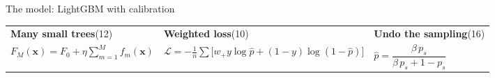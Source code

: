 \documentclass[aspectratio=169,11pt,t]{beamer}
\begin{document}
\begin{frame}{The model: LightGBM with calibration}
\vspace{-3mm}
\begin{center}
\resizebox{0.74\linewidth}{!}{}
\end{center}
\vspace{-3mm}
\begin{softbox}\scriptsize
\begin{tabularx}{\linewidth}{@{}>{\hsize=0.85\hsize}X >{\hsize=1.35\hsize}X >{\hsize=0.8\hsize}X@{}}
\textbf{Many small trees}\hfill{\color{black!55}(12)} &
\textbf{Weighted loss}\hfill{\color{black!55}(10)} &
\textbf{Undo the sampling}\hfill{\color{black!55}(16)} \\[4pt]
\centering $F_M(\mathbf{x})=F_0+\eta\sum_{m=1}^{M} f_m(\mathbf{x})$ &
\centering $\mathcal{L}=-\frac{1}{n}\sum\big[w_{+}y\log\hat p+(1-y)\log(1-\hat p)\big]$ &
\centering\arraybackslash $\hat p=\dfrac{\beta\,p_s}{\beta\,p_s+1-p_s}$
\end{tabularx}
\end{softbox}
\end{frame}
\end{document}
